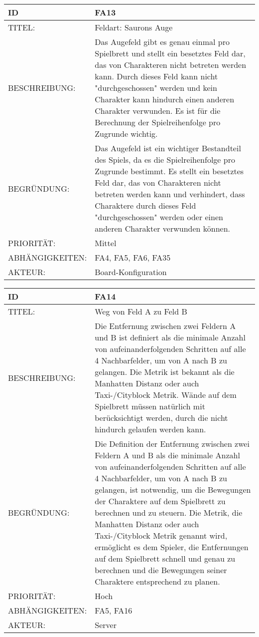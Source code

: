 \documentclass{uulm-assignment}
\begin{document}
    \begin{tabularx}{\textwidth}{|l|X |} \hline
        \textbf{ID} & \textbf{FA13} \\
        \hline
        TITEL: & Feldart: Saurons Auge \\
        \hline
        BESCHREIBUNG: &   Das Augefeld gibt es genau einmal pro Spielbrett und stellt ein besetztes Feld dar, das von Charakteren nicht betreten werden kann. Durch dieses Feld kann nicht "durchgeschossen" werden und kein Charakter kann hindurch einen anderen Charakter verwunden. Es ist für die Berechnung der Spielreihenfolge pro Zugrunde wichtig.
        \\
        \hline
        BEGRÜNDUNG: &  Das Augefeld ist ein wichtiger Bestandteil des Spiels, da es die Spielreihenfolge pro Zugrunde bestimmt. Es stellt ein besetztes Feld dar, das von Charakteren nicht betreten werden kann und verhindert, dass Charaktere durch dieses Feld "durchgeschossen" werden oder einen anderen Charakter verwunden können.\\
        \hline
        PRIORITÄT: & Mittel\\
        \hline
        ABHÄNGIGKEITEN: & FA4, FA5, FA6, FA35\\
        \hline
        AKTEUR: & Board-Konfiguration
        \\
        \hline
    \end{tabularx}
    
    \begin{tabularx}{\textwidth}{|l|X |} \hline
        \textbf{ID} & \textbf{FA14} \\
        \hline
        TITEL: &  Weg von Feld A zu Feld B\\
        \hline
        BESCHREIBUNG: & Die Entfernung zwischen zwei Feldern A und B ist definiert als die minimale Anzahl von aufeinanderfolgenden Schritten auf alle 4 Nachbarfelder, um von A nach B zu gelangen. Die Metrik ist bekannt als die Manhatten Distanz oder auch Taxi-/Cityblock Metrik. Wände auf dem Spielbrett müssen natürlich mit berücksichtigt werden, durch die nicht hindurch gelaufen werden kann.
        \\
        \hline
        BEGRÜNDUNG: & Die Definition der Entfernung zwischen zwei Feldern A und B als die minimale Anzahl von aufeinanderfolgenden Schritten auf alle 4 Nachbarfelder, um von A nach B zu gelangen, ist notwendig, um die Bewegungen der Charaktere auf dem Spielbrett zu berechnen und zu steuern. Die Metrik, die Manhatten Distanz oder auch Taxi-/Cityblock Metrik genannt wird, ermöglicht es dem Spieler, die Entfernungen auf dem Spielbrett schnell und genau zu berechnen und die Bewegungen seiner Charaktere entsprechend zu planen.\\
        \hline
        PRIORITÄT: & Hoch\\
        \hline
        ABHÄNGIGKEITEN: & FA5, FA16 \\
        \hline
        AKTEUR: & Server\\
        \hline
    \end{tabularx}
    
\end{document}
